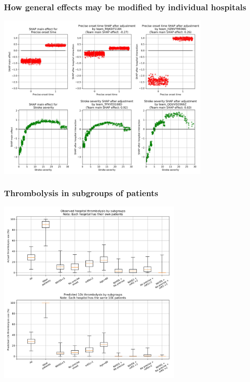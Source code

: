 \documentclass{beamer}
\begin{document}

\begin{frame}
\frametitle{How general effects may be modified by individual hospitals}

\begin{center}
\includegraphics[width=0.80\textwidth]{./images/12aa_two_way_shap_adjustment.jpg}
\end{center}
\end{frame}


\begin{frame}
\frametitle{Thrombolysis in subgroups of patients}

\begin{center}
\includegraphics[width=0.69\textwidth]{./images/15a_actual_vs_modelled_subgroup_violin.jpg}
\end{center}
\end{frame}
\end{document}
